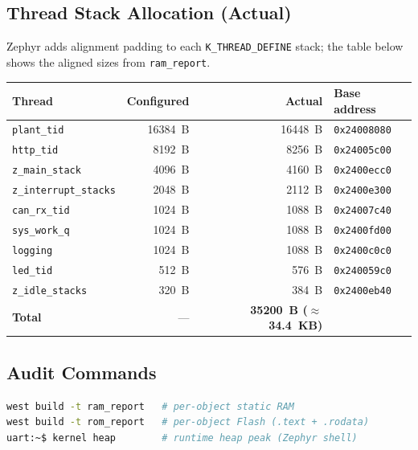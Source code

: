 \documentclass[11pt,a4paper]{article}
\begin{document}
\subsection{Thread Stack Allocation (Actual)}

Zephyr adds alignment padding to each \texttt{K\_THREAD\_DEFINE} stack;
the table below shows the aligned sizes from \texttt{ram\_report}.

\begin{center}
\begin{tabular}{lrrl}
\toprule
Thread & Configured & Actual & Base address \\
\midrule
\texttt{plant\_tid} & \SI{16384}{B} & \SI{16448}{B} & \texttt{0x24008080} \\
\texttt{http\_tid}  & \SI{8192}{B}  & \SI{8256}{B}  & \texttt{0x24005c00} \\
\texttt{z\_main\_stack} & \SI{4096}{B} & \SI{4160}{B} & \texttt{0x2400ecc0} \\
\texttt{z\_interrupt\_stacks} & \SI{2048}{B} & \SI{2112}{B} & \texttt{0x2400e300} \\
\texttt{can\_rx\_tid} & \SI{1024}{B} & \SI{1088}{B} & \texttt{0x24007c40} \\
\texttt{sys\_work\_q} & \SI{1024}{B} & \SI{1088}{B} & \texttt{0x2400fd00} \\
\texttt{logging}     & \SI{1024}{B} & \SI{1088}{B} & \texttt{0x2400c0c0} \\
\texttt{led\_tid}    & \SI{512}{B}  & \SI{576}{B}  & \texttt{0x240059c0} \\
\texttt{z\_idle\_stacks} & \SI{320}{B} & \SI{384}{B} & \texttt{0x2400eb40} \\
\midrule
\textbf{Total} & --- & \textbf{\SI{35200}{B} ($\approx$\SI{34.4}{KB})} & \\
\bottomrule
\end{tabular}
\end{center}

\subsection{Audit Commands}

\begin{lstlisting}[language=bash, caption={RAM and Flash audit}]
west build -t ram_report   # per-object static RAM
west build -t rom_report   # per-object Flash (.text + .rodata)
uart:~$ kernel heap        # runtime heap peak (Zephyr shell)
\end{lstlisting}
\end{document}
